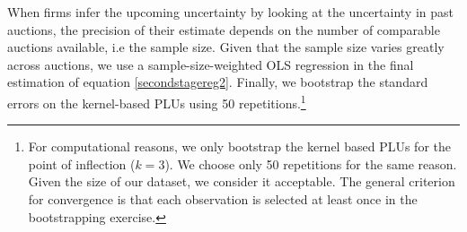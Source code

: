 %
%
%
%
%


When firms infer the upcoming uncertainty by looking at the uncertainty in past auctions, the precision of their estimate depends on the number of comparable auctions available, i.e the sample size. Given that the sample size varies greatly across auctions, we use a sample-size-weighted OLS regression in the final estimation of equation \ref{secondstagereg2}. Finally, we bootstrap the standard errors on the kernel-based PLUs using 50 repetitions.\footnote{For computational reasons, we only bootstrap the kernel based PLUs for the point of inflection ($k=3$). We choose only 50 repetitions for the same reason. Given the size of our dataset, we consider it acceptable.  The general criterion for convergence is that each observation is selected at least once in the bootstrapping exercise.}\\


